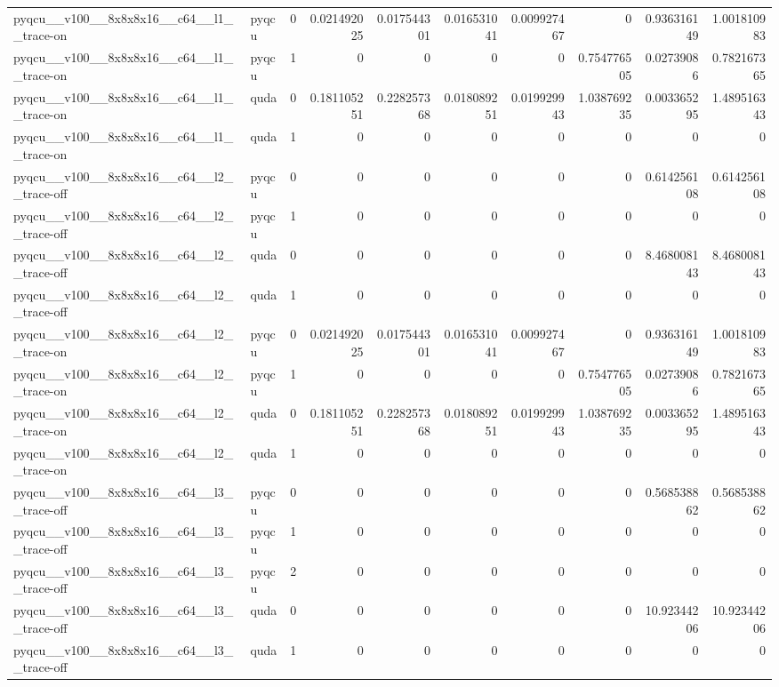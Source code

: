 \begin{table}[htbp]
\begin{tabular}{@{}llrrrrrrrr@{}}
pyqcu\_\_v100\_\_8x8x8x16\_\_c64\_\_l1\_\_trace-on & pyqcu & 0 & 0.021492025 & 0.017544301 & 0.016531041 & 0.009927467 & 0 & 0.936316149 & 1.001810983 \\
pyqcu\_\_v100\_\_8x8x8x16\_\_c64\_\_l1\_\_trace-on & pyqcu & 1 & 0 & 0 & 0 & 0 & 0.754776505 & 0.02739086 & 0.782167365 \\
pyqcu\_\_v100\_\_8x8x8x16\_\_c64\_\_l1\_\_trace-on & quda & 0 & 0.181105251 & 0.228257368 & 0.018089251 & 0.019929943 & 1.038769235 & 0.003365295 & 1.489516343 \\
pyqcu\_\_v100\_\_8x8x8x16\_\_c64\_\_l1\_\_trace-on & quda & 1 & 0 & 0 & 0 & 0 & 0 & 0 & 0 \\
pyqcu\_\_v100\_\_8x8x8x16\_\_c64\_\_l2\_\_trace-off & pyqcu & 0 & 0 & 0 & 0 & 0 & 0 & 0.614256108 & 0.614256108 \\
pyqcu\_\_v100\_\_8x8x8x16\_\_c64\_\_l2\_\_trace-off & pyqcu & 1 & 0 & 0 & 0 & 0 & 0 & 0 & 0 \\
pyqcu\_\_v100\_\_8x8x8x16\_\_c64\_\_l2\_\_trace-off & quda & 0 & 0 & 0 & 0 & 0 & 0 & 8.468008143 & 8.468008143 \\
pyqcu\_\_v100\_\_8x8x8x16\_\_c64\_\_l2\_\_trace-off & quda & 1 & 0 & 0 & 0 & 0 & 0 & 0 & 0 \\
pyqcu\_\_v100\_\_8x8x8x16\_\_c64\_\_l2\_\_trace-on & pyqcu & 0 & 0.021492025 & 0.017544301 & 0.016531041 & 0.009927467 & 0 & 0.936316149 & 1.001810983 \\
pyqcu\_\_v100\_\_8x8x8x16\_\_c64\_\_l2\_\_trace-on & pyqcu & 1 & 0 & 0 & 0 & 0 & 0.754776505 & 0.02739086 & 0.782167365 \\
pyqcu\_\_v100\_\_8x8x8x16\_\_c64\_\_l2\_\_trace-on & quda & 0 & 0.181105251 & 0.228257368 & 0.018089251 & 0.019929943 & 1.038769235 & 0.003365295 & 1.489516343 \\
pyqcu\_\_v100\_\_8x8x8x16\_\_c64\_\_l2\_\_trace-on & quda & 1 & 0 & 0 & 0 & 0 & 0 & 0 & 0 \\
pyqcu\_\_v100\_\_8x8x8x16\_\_c64\_\_l3\_\_trace-off & pyqcu & 0 & 0 & 0 & 0 & 0 & 0 & 0.568538862 & 0.568538862 \\
pyqcu\_\_v100\_\_8x8x8x16\_\_c64\_\_l3\_\_trace-off & pyqcu & 1 & 0 & 0 & 0 & 0 & 0 & 0 & 0 \\
pyqcu\_\_v100\_\_8x8x8x16\_\_c64\_\_l3\_\_trace-off & pyqcu & 2 & 0 & 0 & 0 & 0 & 0 & 0 & 0 \\
pyqcu\_\_v100\_\_8x8x8x16\_\_c64\_\_l3\_\_trace-off & quda & 0 & 0 & 0 & 0 & 0 & 0 & 10.92344206 & 10.92344206 \\
pyqcu\_\_v100\_\_8x8x8x16\_\_c64\_\_l3\_\_trace-off & quda & 1 & 0 & 0 & 0 & 0 & 0 & 0 & 0 \\

\end{tabular}
\end{table}
